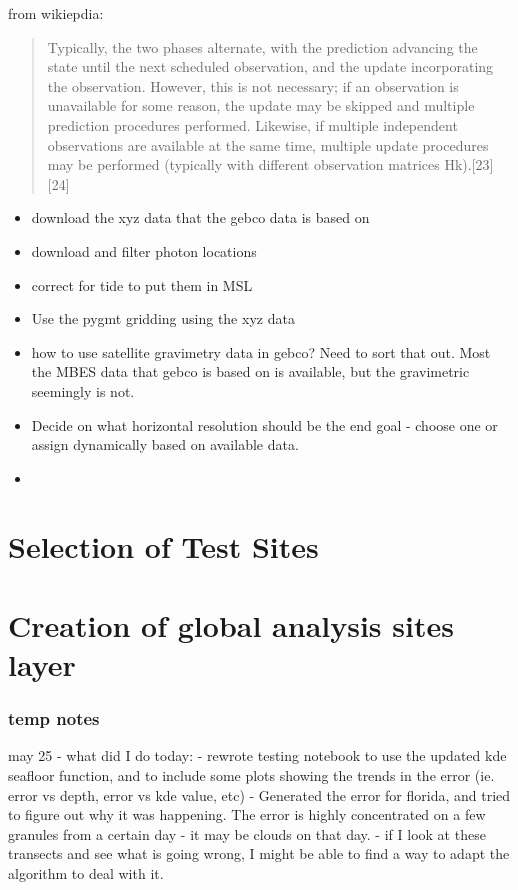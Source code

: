from wikiepdia: 
\begin{quotation}
    Typically, the two phases alternate, with the prediction advancing the state until the next scheduled observation, and the update incorporating the observation. However, this is not necessary; if an observation is unavailable for some reason, the update may be skipped and multiple prediction procedures performed. Likewise, if multiple independent observations are available at the same time, multiple update procedures may be performed (typically with different observation matrices Hk).[23][24]
\end{quotation}
\begin{itemize}
    \color{orange}
    \item download the xyz data that the gebco data is based on
    \item download and filter photon locations
    \item correct for tide to put them in MSL
    \item Use the pygmt gridding using the xyz data
    \item how to use satellite gravimetry data in gebco? Need to sort that out. Most the MBES data that gebco is based on is available, but the gravimetric seemingly is not.
    \item Decide on what horizontal resolution should be the end goal - choose one or assign dynamically based on available data. 
    \item 
\end{itemize}


\section{Selection of Test Sites}
\section{Creation of global analysis sites layer}
\subsubsection*{temp notes}

may 25 - what did I do today:
- rewrote testing notebook to use the updated kde seafloor function, and to include some plots showing the trends in the error (ie. error vs depth, error vs kde value, etc)
- Generated the error for florida, and tried to figure out why it was happening. The error is highly concentrated on a few granules from a certain day - it may be clouds on that day.
- if I look at these transects and see what is going wrong, I might be able to find a way to adapt the algorithm to deal with it.


